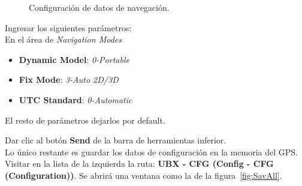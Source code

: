 \begin{figure}[H] %
\caption{Configuración de datos de navegación.}
\label{fig:Nav_Rover}
\end{figure}

Ingresar los siguientes parámetros:\\

En el área de \textit{Navigation Modes}
\begin{itemize}
\item \textbf{Dynamic Model}: \textit{0-Portable}
\item \textbf{Fix Mode}: \textit{3-Auto 2D/3D}
\item \textbf{UTC Standard}: \textit{0-Automatic}
\end{itemize}

El resto de parámetros dejarlos por default\footnotemark. \\


Dar clic al botón \textbf{Send} de la barra de herramientas inferior.\\

Lo único restante es guardar los datos de configuración en la memoria del GPS. Visitar en la lista de la izquierda la ruta: \textbf{UBX - CFG (Config - CFG (Configuration))}. Se abrirá una ventana como la de la figura~\ref{fig:SavAll}.

